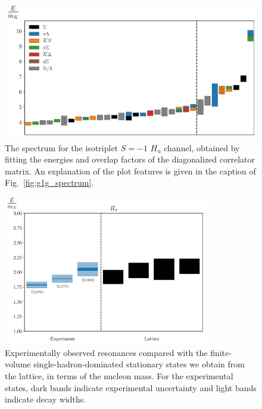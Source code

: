 \begin{figure}[H]
    \centering
    \hspace*{-0.5in}\includegraphics[width=\textwidth]{figures/sigmas/hu/staircase_mk.pdf}
    \caption[The spectrum for the isotriplet $S=-1$ $H_u$ channel, obtained by fitting the energies and overlap factors of the diagonalized correlator matrix.]{The spectrum for the isotriplet $S=-1$ $H_u$ channel, obtained by fitting the energies and overlap factors of the diagonalized correlator matrix. An explanation of the plot features is given in the caption of Fig.~\ref{fig:g1g_spectrum}.}\label{fig:hu_spectrum}
\end{figure}

\begin{figure}[H]
    \centering
    \hspace*{-1cm}\includegraphics[width=0.8\textwidth]{figures/sigmas/hu/expvslat.pdf}
    \caption[Experimentally observed resonances compared with the finite-volume single-hadron-dominated stationary states we obtain from the lattice in $H_u$, in terms of the nucleon mass.]{Experimentally observed resonances compared with the finite-volume single-hadron-dominated stationary states we obtain from the lattice, in terms of the nucleon mass. For the experimental states, dark bands indicate experimental uncertainty and light bands indicate decay widths.}\label{fig:hu_exp}
\end{figure}

